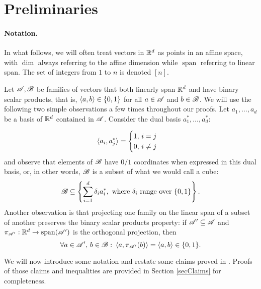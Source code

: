 \section{Preliminaries}\label{secStability}
\paragraph{Notation.}
In what follows, we will often treat vectors in ${\mathbb{R}}^d$ as points in an affine space, with $\operatorname{dim}$ always referring to the affine dimension while $\operatorname{span}$ referring to linear span. The set of integers  from $1$ to $n$ is denoted $[n]$. 

Let ${\mathscr{A}}, {\mathscr{B}}$ be families of vectors that both linearly span ${\mathbb{R}}^d$ and have binary scalar products, that is, $\langle a, b \rangle \in \{0,1\}$ for all $a \in {\mathscr{A}}$ and $b \in {\mathscr{B}}$. We will use the following two simple observations a few times throughout our proofs. Let $a_1, \ldots, a_d$ be a basis of ${\mathbb{R}}^d$ contained in ${\mathscr{A}}$. Consider the dual basis $a_1^*, \ldots, a_d^*$:

\[
    \langle a_i, a_j^* \rangle = 
    \begin{cases}
        1,\, i = j \\
        0,\, i\neq j
    \end{cases}
\]
and observe that elements of ${\mathscr{B}}$ have $0/1$ coordinates when expressed in this dual basis, or, in other words, ${\mathscr{B}}$ is a subset of what we would call a cube: 
\[
    {\mathscr{B}} \subseteq \left\{\sum_{i=1}^d \delta_i a_i^*, \text{ where } \delta_i \text{ range over } \{0, 1\}\right\}.
\]
Another observation is that projecting one family on the linear span of a subset of another preserves the binary scalar products property: if ${\mathscr{A}}' \subseteq {\mathscr{A}}$ and $\pi_{{\mathscr{A}}'}: {\mathbb{R}}^d \rightarrow \operatorname{span}({\mathscr{A}}')$ is the orthogonal projection, then
\[
    \forall a \in {\mathscr{A}}',\, b \in {\mathscr{B}}:\: \langle a, \pi_{{\mathscr{A}}'}(b) \rangle = \langle a, b \rangle \in \{0,1\}. 
\]

\noindent We will now introduce some notation and restate some claims proved in \cite{kupavskii22}. Proofs of those claims and inequalities are provided in Section \ref{secClaims} for completeness.

